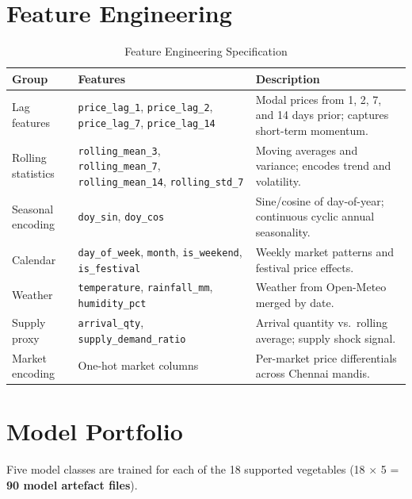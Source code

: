 \documentclass[12pt, a4paper, oneside]{report}
\begin{document}
\section{Feature Engineering}

\begin{table}[H]
\centering
\caption{Feature Engineering Specification}
\label{tab:features-eng}
\begin{tabularx}{\textwidth}{@{} L{3.0cm} L{4.8cm} X @{}}
\toprule
\textbf{Group} & \textbf{Features} & \textbf{Description} \\
\midrule
Lag features
  & \texttt{price\_lag\_1}, \texttt{price\_lag\_2},
    \texttt{price\_lag\_7}, \texttt{price\_lag\_14}
  & Modal prices from 1, 2, 7, and 14 days prior; captures short-term
    momentum. \\[4pt]
Rolling statistics
  & \texttt{rolling\_mean\_3}, \texttt{rolling\_mean\_7},
    \texttt{rolling\_mean\_14}, \texttt{rolling\_std\_7}
  & Moving averages and variance; encodes trend and volatility. \\[4pt]
Seasonal encoding
  & \texttt{doy\_sin}, \texttt{doy\_cos}
  & Sine/cosine of day-of-year; continuous cyclic annual seasonality. \\[4pt]
Calendar
  & \texttt{day\_of\_week}, \texttt{month},
    \texttt{is\_weekend}, \texttt{is\_festival}
  & Weekly market patterns and festival price effects. \\[4pt]
Weather
  & \texttt{temperature}, \texttt{rainfall\_mm},
    \texttt{humidity\_pct}
  & Weather from Open-Meteo merged by date. \\[4pt]
Supply proxy
  & \texttt{arrival\_qty},
    \texttt{supply\_demand\_ratio}
  & Arrival quantity vs.\ rolling average; supply shock signal. \\[4pt]
Market encoding
  & One-hot market columns
  & Per-market price differentials across Chennai mandis. \\
\bottomrule
\end{tabularx}
\end{table}

\section{Model Portfolio}

Five model classes are trained for each of the 18 supported vegetables
(18 $\times$ 5 = \textbf{90 model artefact files}).
\end{document}
